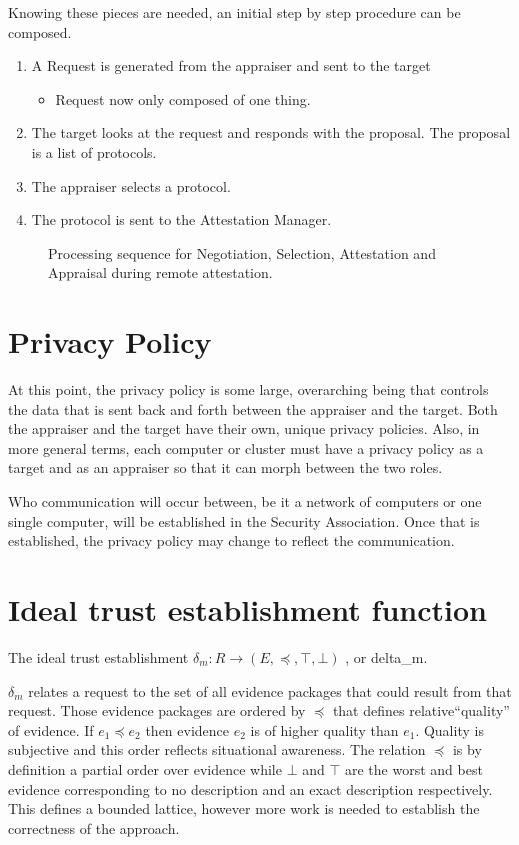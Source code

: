 \documentclass[10pt]{report}
\begin{document}
Knowing these pieces are needed, an initial step by step procedure can be composed.
\begin{enumerate}
\item A Request is generated from the appraiser and sent to the target
	\begin{itemize}
	\item Request now only composed of one thing.
	\end{itemize}
\item The target looks at the request and responds with the proposal. The proposal is a list of protocols. 
\item The appraiser selects a protocol.
\item The protocol is sent to the Attestation Manager.  
\end{enumerate} 

\begin{figure}[hbtp]
  \centering
  
  \caption[Attestation and Appraisal Sequence for One Request]{Processing sequence for
    Negotiation, Selection, Attestation and Appraisal during remote
    attestation.}
  \label{fig:att-app-seq}
\end{figure}

\section {Privacy Policy}

At this point, the privacy policy is some large, overarching being that controls the data that is sent back and forth between the appraiser and the target. Both the appraiser and the target have their own, unique privacy policies. Also, in more general terms, each computer or cluster must have a privacy policy as a target and as an appraiser so that it can morph between the two roles. 

Who communication will occur between, be it a network of computers or one single computer, will be established in the Security Association. Once that is established, the privacy policy may change to reflect the communication. 

\section {Ideal trust establishment function}

The ideal trust establishment $\delta_m:R\rightarrow (E,\preceq,\top,\bot)$ , or delta_m. 

$\delta_m$ relates a request to the set of all evidence packages that 
could result from that request.  Those evidence packages are ordered
by $\preceq$ that defines relative``quality'' of evidence.  If
$e_1\preceq e_2$ then evidence $e_2$ is of higher quality than $e_1$.
Quality is subjective and this order reflects situational awareness.
The relation $\preceq$ is by definition a partial order 
over evidence while $\bot$ and $\top$ are the worst and best evidence
corresponding to no description and an exact description
respectively.  This defines a bounded lattice, however more work is
needed to establish the correctness of the approach.
\end{document}
